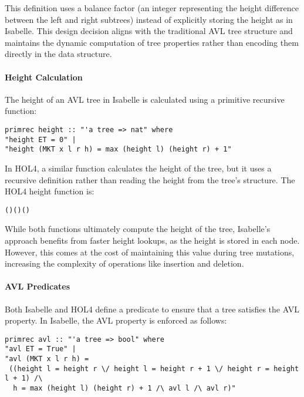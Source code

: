 \documentclass[12pt]{article}
\begin{document}
This definition uses a balance factor (an integer representing the height difference between the left and right subtrees) instead of explicitly storing the height as in Isabelle. This design decision aligns with the traditional AVL tree structure and maintains the dynamic computation of tree properties rather than encoding them directly in the data structure.

\paragraph{Height Calculation}
The height of an AVL tree in Isabelle is calculated using a primitive recursive function:

\begin{verbatim}
primrec height :: "'a tree => nat" where
"height ET = 0" |
"height (MKT x l r h) = max (height l) (height r) + 1"
\end{verbatim}

In HOL4, a similar function calculates the height of the tree, but it uses a recursive definition rather than reading the height from the tree’s structure. The HOL4 height function is:

\begin{alltt}
  \HOLTokenDefEquality{} 
 (     ) \HOLTokenDefEquality{}  ( ) ( ) \HOLSymConst{\ensuremath{+}} 
\end{alltt}

While both functions ultimately compute the height of the tree, Isabelle’s approach benefits from faster height lookups, as the height is stored in each node. However, this comes at the cost of maintaining this value during tree mutations, increasing the complexity of operations like insertion and deletion.

\paragraph{AVL Predicates}
Both Isabelle and HOL4 define a predicate to ensure that a tree satisfies the AVL property. In Isabelle, the AVL property is enforced as follows:

\begin{verbatim}
primrec avl :: "'a tree => bool" where
"avl ET = True" |
"avl (MKT x l r h) =
 ((height l = height r \/ height l = height r + 1 \/ height r = height l + 1) /\ 
  h = max (height l) (height r) + 1 /\ avl l /\ avl r)"
\end{verbatim}
\end{document}
